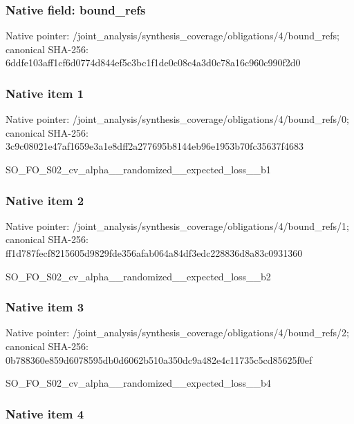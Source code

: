 \documentclass[10pt,a4paper]{article}
\begin{document}
\subsubsection{Native field: bound\_refs}


Native pointer: /joint\_analysis/synthesi\allowbreak{}s\_coverage/obligations/4\allowbreak{}/bound\_refs; canonical SHA-256: 6ddfe103aff1cf6d0774d844\allowbreak{}ef5c3bc1f1de0c08c4a3d0c7\allowbreak{}8a16c960c990f2d0



\subsubsection{Native item 1}


Native pointer: /joint\_analysis/synthesi\allowbreak{}s\_coverage/obligations/4\allowbreak{}/bound\_refs/0; canonical SHA-256: 3c9c08021e47af1659e3a1e8\allowbreak{}dff2a277695b8144eb96e195\allowbreak{}3b70fc35637f4683


SO\_FO\_S02\_cv\_alpha\_\_rand\allowbreak{}omized\_\_expected\_loss\_\_b\allowbreak{}1


\subsubsection{Native item 2}


Native pointer: /joint\_analysis/synthesi\allowbreak{}s\_coverage/obligations/4\allowbreak{}/bound\_refs/1; canonical SHA-256: ff1d787fecf8215605d9829f\allowbreak{}de356afab064a84df3edc228\allowbreak{}836d8a83c0931360


SO\_FO\_S02\_cv\_alpha\_\_rand\allowbreak{}omized\_\_expected\_loss\_\_b\allowbreak{}2


\subsubsection{Native item 3}


Native pointer: /joint\_analysis/synthesi\allowbreak{}s\_coverage/obligations/4\allowbreak{}/bound\_refs/2; canonical SHA-256: 0b788360e859d6078595db0d\allowbreak{}6062b510a350dc9a482e4c11\allowbreak{}735c5cd85625f0ef


SO\_FO\_S02\_cv\_alpha\_\_rand\allowbreak{}omized\_\_expected\_loss\_\_b\allowbreak{}4


\subsubsection{Native item 4}
\end{document}
